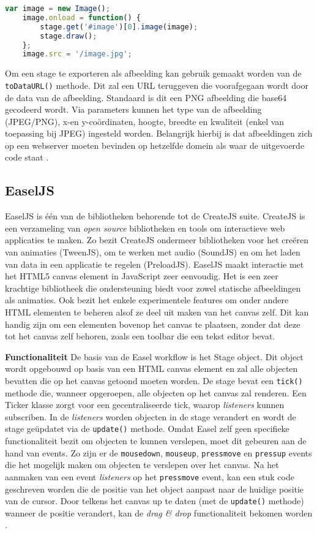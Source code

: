\begin{lstlisting}[language=javascript]
	var image = new Image();
    image.onload = function() {
        stage.get('#image')[0].image(image);
        stage.draw();
    };
    image.src = '/image.jpg';
\end{lstlisting}

Om een stage te exporteren als afbeelding kan gebruik gemaakt worden van de \lstinline{toDataURL()} methode. Dit zal een URL teruggeven die voorafgegaan wordt door de data van de afbeelding. Standaard is dit een PNG afbeelding die base64 gecodeerd wordt. Via parameters kunnen het type van de afbeelding (JPEG/PNG), x-en y-co\"{o}rdinaten, hoogte, breedte en kwaliteit (enkel van toepassing bij JPEG) ingesteld worden. Belangrijk hierbij is dat afbeeldingen zich op een webserver moeten bevinden op hetzelfde domein als waar de uitgevoerde code staat \cite{KonvaToImage}. 

\subsection{EaselJS}
EaselJS is \'{e}\'{e}n van de bibliotheken behorende tot de CreateJS suite. CreateJS is een verzameling van \textit{open source} bibliotheken en tools om interactieve web applicaties te maken. Zo bezit CreateJS ondermeer bibliotheken voor het cre\"{e}ren van animaties (TweenJS), om te werken met audio (SoundJS) en om het laden van data in een applicatie te regelen (PreloadJS). EaselJS maakt interactie met het HTML5 canvas element in JavaScript zeer eenvoudig. Het is een zeer krachtige bibliotheek die ondersteuning biedt voor zowel statische afbeeldingen als animaties. Ook bezit het enkele experimentele features om onder andere HTML elementen te beheren alsof ze deel uit maken van het canvas zelf. Dit kan handig zijn om een elementen bovenop het canvas te plaatsen, zonder dat deze tot het canvas zelf behoren, zoals een toolbar die een tekst editor bevat. 

\textbf{Functionaliteit} \break
De basis van de Easel workflow is het Stage object. Dit object wordt opgebouwd op basis van een HTML canvas element en zal alle objecten bevatten die op het canvas getoond moeten worden. De stage bevat een \lstinline{tick()} methode die, wanneer opgeroepen, alle objecten op het canvas zal renderen. Een Ticker klasse zorgt voor een gecentraliseerde tick, waarop \textit{listeners} kunnen subscriben. In de \textit{listeners} worden objecten in de stage verandert en wordt de stage ge\"{u}pdatet via de \lstinline{update()} methode. Omdat Easel zelf geen specifieke functionaliteit bezit om objecten te kunnen verslepen, moet dit gebeuren aan de hand van events. Zo zijn er de \lstinline{mousedown}, \lstinline{mouseup}, \lstinline{pressmove} en \lstinline{pressup} events die het mogelijk maken om objecten te verslepen over het canvas. Na het aanmaken van een event \textit{listeners} op het \lstinline{pressmove} event, kan een stuk code geschreven worden die de positie van het object aanpast naar de huidige positie van de cursor. Door telkens het canvas up te daten (met de \lstinline{update()} methode) wanneer de positie verandert, kan de \textit{drag \& drop} functionaliteit bekomen worden \cite{EaselMouseInteraction}.  

